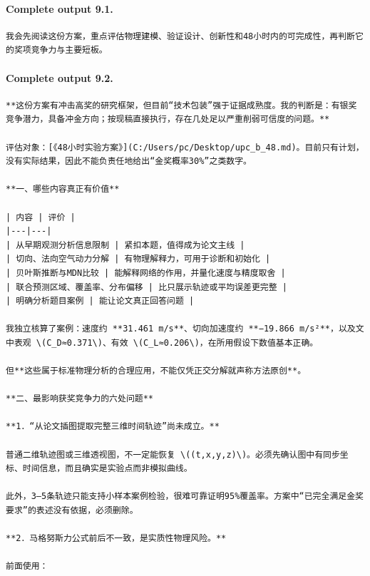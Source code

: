 \documentclass[UTF8,10pt]{ctexart}
\begin{document}
\paragraph{Complete output 9.1.}
\begin{Verbatim}[breaklines=true,breakanywhere=true,fontsize=\scriptsize,frame=single,framesep=2pt]
我会先阅读这份方案，重点评估物理建模、验证设计、创新性和48小时内的可完成性，再判断它的奖项竞争力与主要短板。
\end{Verbatim}

\paragraph{Complete output 9.2.}
\begin{Verbatim}[breaklines=true,breakanywhere=true,fontsize=\scriptsize,frame=single,framesep=2pt]
**这份方案有冲击高奖的研究框架，但目前“技术包装”强于证据成熟度。我的判断是：有银奖竞争潜力，具备冲金方向；按现稿直接执行，存在几处足以严重削弱可信度的问题。**

评估对象：[《48小时实验方案》](C:/Users/pc/Desktop/upc_b_48.md)。目前只有计划，没有实际结果，因此不能负责任地给出“金奖概率30%”之类数字。

**一、哪些内容真正有价值**

| 内容 | 评价 |
|---|---|
| 从早期观测分析信息限制 | 紧扣本题，值得成为论文主线 |
| 切向、法向空气动力分解 | 有物理解释力，可用于诊断和初始化 |
| 贝叶斯推断与MDN比较 | 能解释网络的作用，并量化速度与精度取舍 |
| 联合预测区域、覆盖率、分布偏移 | 比只展示轨迹或平均误差更完整 |
| 明确分析题目案例 | 能让论文真正回答问题 |

我独立核算了案例：速度约 **31.461 m/s**、切向加速度约 **−19.866 m/s²**，以及文中表观 \(C_D≈0.371\)、有效 \(C_L≈0.206\)，在所用假设下数值基本正确。

但**这些属于标准物理分析的合理应用，不能仅凭正交分解就声称方法原创**。

**二、最影响获奖竞争力的六处问题**

**1．“从论文插图提取完整三维时间轨迹”尚未成立。**

普通二维轨迹图或三维透视图，不一定能恢复 \((t,x,y,z)\)。必须先确认图中有同步坐标、时间信息，而且确实是实验点而非模拟曲线。

此外，3—5条轨迹只能支持小样本案例检验，很难可靠证明95%覆盖率。方案中“已完全满足金奖要求”的表述没有依据，必须删除。

**2．马格努斯力公式前后不一致，是实质性物理风险。**

前面使用：


\end{Verbatim}
\end{document}
